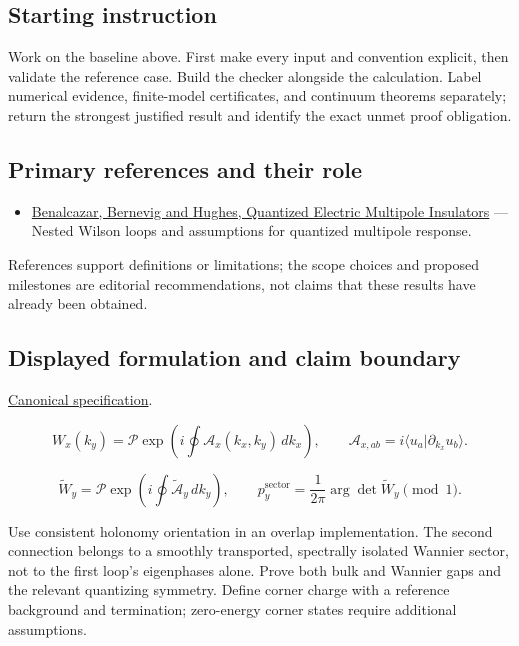 \documentclass[
  11pt,
]{article}
\providecommand{\tightlist}{%
  \setlength{\itemsep}{0pt}\setlength{\parskip}{0pt}}
\begin{document}
\subsection{Starting instruction}

Work on the baseline above. First make every input and convention
explicit, then validate the reference case. Build the checker alongside
the calculation. Label numerical evidence, finite-model certificates,
and continuum theorems separately; return the strongest justified result
and identify the exact unmet proof obligation.

\subsection{Primary references and their role}

\begin{itemize}
\tightlist
\item
  \href{https://arxiv.org/abs/1611.07987}{Benalcazar, Bernevig and
  Hughes, Quantized Electric Multipole Insulators} --- Nested Wilson
  loops and assumptions for quantized multipole response.
\end{itemize}

References support definitions or limitations; the scope choices and
proposed milestones are editorial recommendations, not claims that these
results have already been obtained.

\subsection{Displayed formulation and claim boundary}

\href{https://github.com/rick-stevens-ai/Pure-Thought/blob/main/PRDs/13-Higher-Order-Topological-Insulators.md}{Canonical
specification}.

\[W_x(k_y)=\mathcal P\exp\!\left(i\oint\mathcal A_x(k_x,k_y)\,dk_x\right),
\qquad \mathcal A_{x,ab}=i\langle u_a|\partial_{k_x}u_b\rangle.\]

\[\widetilde W_y=\mathcal P\exp\!\left(i\oint\widetilde{\mathcal A}_y\,dk_y\right),
\qquad p_y^{\mathrm{sector}}=\frac1{2\pi}\arg\det\widetilde W_y\pmod1.\]

Use consistent holonomy orientation in an overlap implementation. The
second connection belongs to a smoothly transported, spectrally isolated
Wannier sector, not to the first loop's eigenphases alone. Prove both
bulk and Wannier gaps and the relevant quantizing symmetry. Define
corner charge with a reference background and termination; zero-energy
corner states require additional assumptions.
\end{document}
